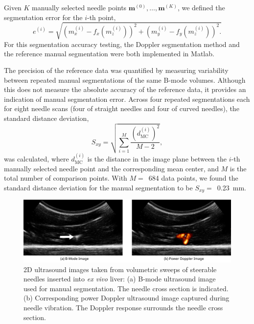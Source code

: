 Given $K$ manually selected needle points $\bm{m}^{(0)}, \dotsc, \bm{m}^{(K)}$, we defined the segmentation error for the $i$-th point,
\begin{equation}
e^{(i)} = \sqrt{ \left(m_x^{(i)}-f_x(m_z^{(i)})\right)^2 + \left(m_y^{(i)}-f_y(m_z^{(i)})\right)^2.} 
\end{equation}
\noindent For this segmentation accuracy testing, the Doppler segmentation method and the reference manual segmentation were both implemented in Matlab.

The precision of the reference data was quantified by measuring variability between repeated manual segmentations of the same B-mode volumes. Although this does not measure the absolute accuracy of the reference data, it provides an indication of manual segmentation error. Across four repeated segmentations each for eight needle scans (four of straight needles and four of curved needles), the standard distance deviation, 
\begin{equation}
S_{xy} = \sqrt{      \sum_{i=1}^{M} \frac{(d^{(i)}_{\text{MC}})^2}{M-2}       },
\end{equation}
\noindent was calculated, where $d^{(i)}_{\text{MC}}$ is the distance in the image plane between the $i$-th manually selected needle point and the corresponding mean center, and $M$ is the total number of comparison points. With $M =$~684 data points, we found the standard distance deviation for the manual segmentation to be $S_{xy} =$~0.23~mm.
 
\begin{figure}[!t]
\centering
\includegraphics[width=\textwidth]{Images/Chapter2/2DUS/2DUS}%
\caption{2D ultrasound images taken from volumetric sweeps of steerable needles inserted into \textit{ex vivo} liver: (a) B-mode ultrasound image used for manual segmentation. The needle cross section is indicated. (b) Corresponding power Doppler ultrasound image captured during needle vibration. The Doppler response surrounds the needle cross section.}
\label{fig:2DUS}
\end{figure} 

